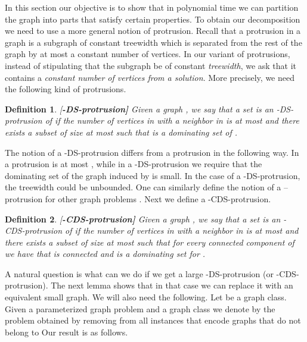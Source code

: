 \documentclass[11pt]{article}
\newtheorem{definition}{Definition}
\begin{document}
In this section our objective is to show that in polynomial time we can  
partition the graph   into parts that satisfy certain properties.  
To obtain  our decomposition we need to use a more general  notion of 
protrusion. Recall that a protrusion in a graph  is a subgraph of constant treewidth which is separated from the rest of the graph by at most a constant number of vertices. In our variant of protrusions, instead of stipulating that the subgraph be of constant {\em treewidth}, we ask that it contains a {\em constant number of vertices from a solution}. More precisely, we need the following kind of protrusions. 
\begin{definition}{\rm [\bf -{\sc DS}-protrusion]} 
 Given a graph , we say that a set  is an {\em -{\sc DS}-protrusion} of  if 
   the number of vertices in  with a neighbor in  is at most  and there exists a 
   subset  of size at most  such that   is a dominating set of . 
\end{definition}





The notion of a -{\sc DS}-protrusion  differs from a protrusion in the following way. In a 
protrusion   is at most , while in a -{\sc DS}-protrusion we require that the dominating set of the graph induced by   is small. In the case of a -{\sc DS}-protrusion, the treewidth could be unbounded. One can similarly define the notion of a --protrusion for other graph problems . Next we define a 
-{\sc CDS}-protrusion. 

\begin{definition}{\rm [\bf -{\sc CDS}-protrusion]} 
 Given a graph , we say that a set  is an {\em -{\sc CDS}-protrusion} of  if 
   the number of vertices in  with a neighbor in  is at most  and there exists a 
   subset  of size at most  such that  for every connected component  of  we have that 
     is connected and is a dominating set for . 
    \end{definition}

A natural question is what can we do if we get a large -{\sc DS}-protrusion (or -{\sc CDS}-protrusion).  The next lemma shows that in that case we can replace it with an equivalent small graph. 
We will also need the following. Let  be a graph class.  Given a  parameterized graph problem   and a graph class  
we denote by  the problem obtained by 
removing from  all instances that 
encode graphs that do not belong to   Our result is as follows. 
\end{document}
